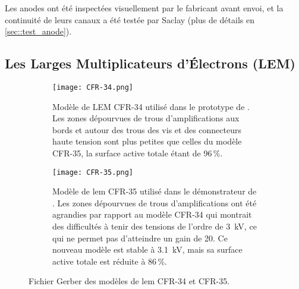       Les anodes ont été inspectées visuellement par le fabricant avant envoi, et la continuité de leurs canaux a été testée par Saclay (plus de détails en \autoref{sec::test_anode}).
        
    \subsection{Les Larges Multiplicateurs d'Électrons (LEM)}\label{sec::LEM}

      \begin{figure}[!htb]
        \begin{subfigure}[t]{0.48\textwidth}
          \centering
          \captionsetup{width=.95\linewidth}
          \texttt{[image: CFR-34.png]}
          \caption{\label{fig::cfr34}Modèle de LEM CFR-34 utilisé dans le prototype de \TOO{}. Les zones dépourvues de trous d'amplifications aux bords et autour des trous des vis et des connecteurs haute tension sont plus petites que celles du modèle CFR-35, la surface active totale étant de 96\,\%.}
        \end{subfigure}
        \hfill
        \begin{subfigure}[t]{0.48\textwidth}
          \centering
          \captionsetup{width=.95\linewidth}
          \texttt{[image: CFR-35.png]}
          \caption{\label{fig::cfr35}Modèle de \gls{lem} CFR-35 utilisé dans le démonstrateur de \SSS{}. Les zones dépourvues de trous d'amplifications ont été agrandies par rapport au modèle CFR-34 qui montrait des difficultés à tenir des tensions de l'ordre de \SI{3}{\kilo\volt}, ce qui ne permet pas d'atteindre un gain de 20. Ce nouveau modèle est stable à \SI{3.1}{\kilo\volt}, mais sa surface active totale est réduite à 86\,\%.}
        \end{subfigure}
        \caption[Modèle de LEM CFR-34 et CFR-35]{Fichier Gerber des modèles de \gls{lem} CFR-34 et CFR-35.}
        \label{fig::cfrs}
      \end{figure}

            
